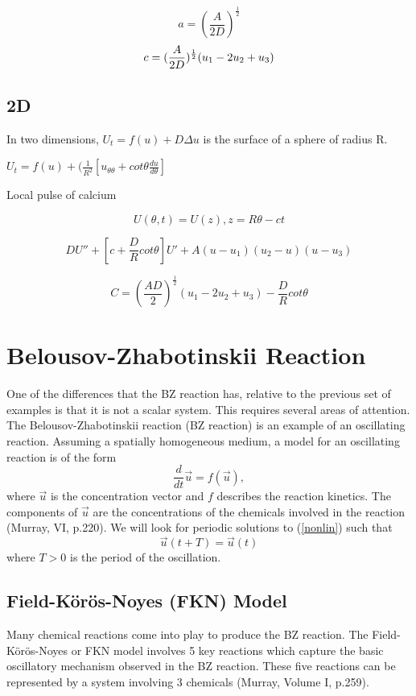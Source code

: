 \documentclass[]{article}
\numberwithin{equation}{section}		%
\let\[\equation
\let\]\endequation
\begin{document}
   $$a =  (\frac{A}{2D} )^{\frac{1}{2}}$$
   $$c=(\frac{A}{2D} )^{\frac{1}{2}}(u_{1}-2u_{2}+u_{3} )\\$$




\subsection{2D}
   In two dimensions, $U_{t}=f(u)+D\Delta u$ is the surface of  a sphere of radius R.

   \begin{center}
   		$U_{t} = f(u)+(\frac{1}{R^{2}} [u_{\theta\theta}+cot\theta\frac{du}{d\theta}]$
   \end{center}

   Local pulse of calcium

  $$ U (\theta,t )=U (z ),  z=R\theta-ct$$

  $$ DU''+ [c+\frac{D}{R}cot\theta ]U'+A (u-u_{1} ) (u_{2}-u ) (u-u_{3} )$$

   $$C =  (\frac{AD}{2} )^{\frac{1}{2}} (u_{1}-2u_{2}+u_{3} )-\frac{D}{R}cot\theta$$
	\[
\]

\newpage
\section{Belousov-Zhabotinskii Reaction}
One of the differences that the BZ reaction has, relative to the previous set of examples is that it is not a scalar system. This requires several areas of attention.
The Belousov-Zhabotinskii reaction (BZ reaction) is an example of an oscillating reaction. Assuming a spatially homogeneous medium, a model for an oscillating reaction is of the form 
\begin{equation}\label{nonlin}
\frac{d}{dt} \vec{u} = f(\vec{u}),
\end{equation}
where $\vec{u}$ is the concentration vector and $f$ describes the reaction kinetics. The components of $\vec{u}$ are the concentrations of the chemicals involved in the reaction (Murray, VI, p.220). We will look for periodic solutions to (\ref{nonlin}) such that
\begin{equation}
\vec{u}(t+T)=\vec{u}(t)
\end{equation}
where $T>0$ is the period of the oscillation.
\subsection{Field-K\"{o}r\"{o}s-Noyes (FKN) Model}
Many chemical reactions come into play to produce the BZ reaction. The Field-K\"{o}r\"{o}s-Noyes or FKN model involves 5 key reactions which capture the basic oscillatory mechanism observed in the BZ reaction. These five reactions can be represented by a system involving 3 chemicals (Murray, Volume I, p.259).
 
\end{document}
